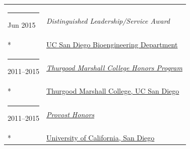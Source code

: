 \documentclass[margin,line]{res}
\begin{document}
\begin{resume}
\begin{longtable}{@{}p{0.7in}p{4in}}
\hspace*{-4mm} \rule{-1mm}{5mm} Jun 2015 & \textit{Distinguished Leadership/Service Award}\\*
\hspace*{-4mm} \hspace*{-4mm} & \hspace{4mm} \href{http://bioengineering.ucsd.edu/}{UC San Diego Bioengineering Department}\\
\hspace*{-4mm} \rule{-1mm}{5mm} 2011--2015 & \href{https://marshall.ucsd.edu/academics/academic-opportunities/tmc-honors-program.html}{\textit{Thurgood Marshall College Honors Program}}\\*
\hspace*{-4mm} \hspace*{-4mm} & \hspace{4mm} \href{https://marshall.ucsd.edu/}{Thurgood Marshall College, UC San Diego}\\
\hspace*{-4mm} \rule{-1mm}{5mm} 2011--2015 & \href{https://roosevelt.ucsd.edu/academics/Academic\%20Opportunities/honors/index.html#Provost-Honors}{\textit{Provost Honors}}\\*
\hspace*{-4mm} \hspace*{-4mm} & \hspace{4mm} \href{http://ucsd.edu/}{University of California, San Diego}\\
\end{longtable}


\end{resume}
\end{document}
